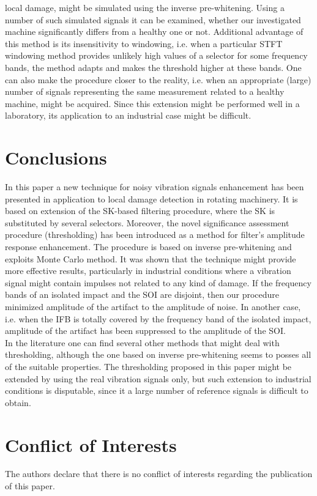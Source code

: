 \documentclass[11pt]{article} %
\begin{document}
local damage, might be simulated using the inverse pre-whitening. Using a number of such simulated signals it can be examined, whether our investigated machine significantly differs from a healthy one or not. Additional advantage of this method is its insensitivity to windowing, i.e. when a particular STFT windowing method provides unlikely high values of a selector for some frequency bands, the method adapts and makes the threshold higher at these bands. One can also make the procedure closer to the reality, i.e. when an appropriate (large) number of signals representing the same measurement related to a healthy machine, might be acquired. Since this extension might be performed well in a laboratory, its application to an industrial case might be difficult.
\section{Conclusions}
In this paper a new technique for noisy vibration signals enhancement has been presented in application to local damage detection in rotating machinery. It is based on extension of the SK-based filtering procedure, where the SK is substituted by several selectors. Moreover, the novel significance assessment procedure (thresholding) has been introduced as a method for filter's amplitude response enhancement. The procedure is based on inverse pre-whitening and exploits Monte Carlo method. It was shown that the technique might provide more effective results, particularly in industrial conditions where a vibration signal might contain impulses not related to any kind of damage. If the frequency bands of an isolated impact and the SOI are disjoint, then our procedure minimized amplitude of the artifact to the amplitude of noise. In another case, i.e. when the IFB is totally covered by the frequency band of the isolated impact, amplitude of the artifact has been suppressed to the amplitude of the SOI.\\
In the literature one can find several other methods that might deal with thresholding, although the one based on inverse pre-whitening seems to posses all of the suitable properties. The thresholding proposed in this paper might be extended by using the real vibration signals only, but such extension to industrial conditions is disputable, since it a large number of reference signals is difficult to obtain.
\section{Conflict of Interests}
The authors declare that there is no conflict of interests
regarding the publication of this paper.
\end{document}
